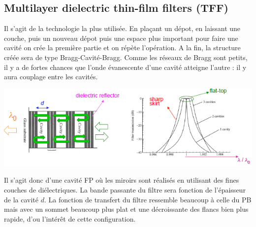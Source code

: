 \newpage
\subsection{Multilayer dielectric thin-film filters (TFF)}
Il s'agit de la technologie la plus utilisée. En plaçant un dépot, en laissant une couche, puis
un nouveau dépot puis une espace plus important pour faire une cavité on crée la première partie
et on répète l'opération. A la fin, la structure créée sera de type Bragg-Cavité-Bragg. Comme les
réseaux de Bragg sont petits, il y a de fortes chances que l'onde évanescente d'une cavité 
atteigne l'autre : il y aura couplage entre les cavités.

\begin{center}
	\includegraphics[scale=0.54]{ch3/image21}
\end{center}

Il s'agit donc d'une cavité FP où les miroirs sont réalisés en utilisant des fines couches de
diélectriques. La bande passante du filtre sera fonction de l'épaisseur de la cavité $d$. La
fonction de transfert du filtre ressemble beaucoup à celle du PB mais avec un sommet beaucoup plus
plat et une décroissante des flancs bien plus rapide, d'ou l'intérêt de cette configuration.




